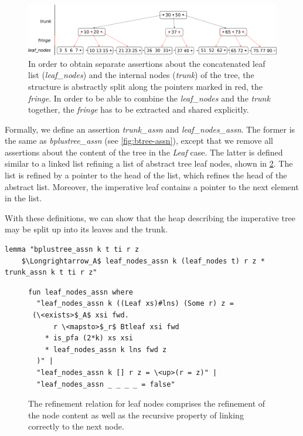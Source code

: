 \documentclass[runningheads]{llncs}
\newcommand{\btree}{B$^+$-tree}
\begin{document}
\begin{figure}
    \centering
    \includegraphics[width=1\linewidth]{btree-view-split.pdf}
    \caption[Split view of the \btree]
    {In order to obtain separate assertions about the concatenated leaf list (\emph{leaf\_nodes})
    and the internal nodes (\emph{trunk}) of the tree, the structure is abstractly split along the
    pointers marked in red, the \emph{fringe}. In order to be able to combine the \emph{leaf\_nodes} and the \emph{trunk} together,
    the \emph{fringe} has to be extracted and shared explicitly.}
    \label{fig:btree-view-split}
\end{figure}


Formally, we define an assertion \emph{trunk\_assn} and \emph{leaf\_nodes\_assn}.
The former is the same as \emph{bplustree\_assn} (see \cref{fig:btree-assn}),
except that we remove all assertions about the content of the tree in the \emph{Leaf} case.
The latter is defined similar to a linked list refining a list of abstract tree leaf nodes,
shown in \cref{fig:leaf-nodes-assn}.
The list is refined by a pointer to the head of the list,
which refines the head of the abstract list.
Moreover, the imperative leaf contains a pointer to the next element in the list.

With these definitions, we can show that the heap describing the imperative tree may be
split up into its leaves and the trunk.

\begin{lstlisting}[mathescape=true, language=Isabelle,label=lst:btree-view-split-oneway]
lemma "bplustree_assn k t ti r z
    $\Longrightarrow_A$ leaf_nodes_assn k (leaf_nodes t) r z * trunk_assn k t ti r z"
\end{lstlisting}

\begin{figure}
    \centering
\begin{lstlisting}[mathescape=true, language=Isabelle,label=lst:leaf-nodes-assn]
fun leaf_nodes_assn where
  "leaf_nodes_assn k ((Leaf xs)#lns) (Some r) z =
 (\<exists>$_A$ xsi fwd.
      r \<mapsto>$_r$ Btleaf xsi fwd
    * is_pfa (2*k) xs xsi
    * leaf_nodes_assn k lns fwd z
  )" |
  "leaf_nodes_assn k [] r z = \<up>(r = z)" |
  "leaf_nodes_assn _ _ _ _ = false"
\end{lstlisting}
\caption[Definition of \emph{leaf\_nodes\_assn}]{
    The refinement relation for leaf nodes comprises the refinement
    of the node content as well as the recursive property of linking correctly to the next node.
}
\label{fig:leaf-nodes-assn}
\end{figure}
\end{document}
